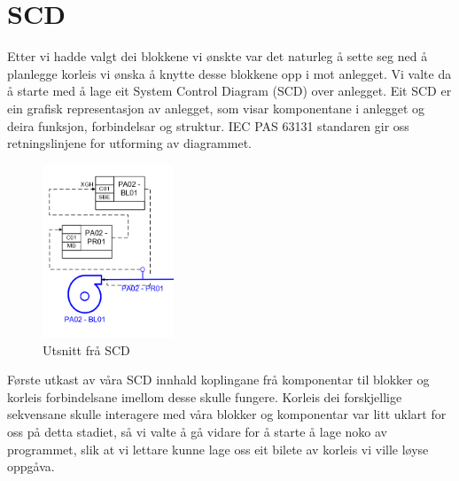 \section{SCD}
\thispagestyle{fancy}

Etter vi hadde valgt dei blokkene vi ønskte var det naturleg å sette seg ned å planlegge korleis vi ønska å knytte desse blokkene opp i mot anlegget. 
Vi valte da å starte med å lage eit System Control Diagram (SCD) over anlegget. 
Eit SCD er ein grafisk representasjon av anlegget, som visar komponentane i anlegget og deira funksjon, forbindelsar og struktur. 
IEC PAS 63131 standaren gir oss retningslinjene for utforming av diagrammet.


\begin{figure}[htbp]
    \centering
    \includegraphics[width=0.35\textwidth]{Bilder/Visio_eksempel.png}
    \caption{Utsnitt frå SCD}\label{fig:SCD eksempel}    
\end{figure}


Første utkast av våra SCD innhald koplingane frå komponentar til blokker og korleis forbindelsane imellom desse skulle fungere. 
Korleis dei forskjellige sekvensane skulle interagere med våra blokker og komponentar var litt uklart for oss på detta stadiet, så vi valte å gå vidare for å starte å lage noko av programmet, slik at vi lettare kunne lage oss eit bilete av korleis vi ville løyse oppgåva.

\newpage